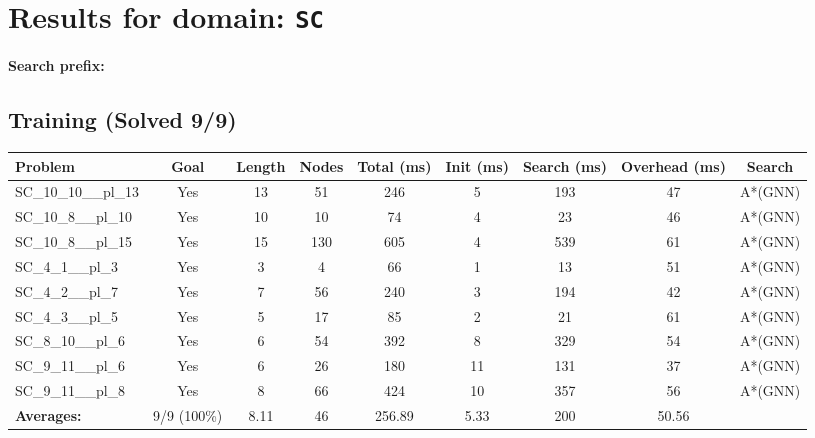 \documentclass{article}
\begin{document}
\section*{Results for domain: \texttt{SC}}
\textbf{Search prefix:} 
\\[0.5cm]
\subsection*{Training (Solved 9/9)}
\begin{tabular}{lcccccccc}
\toprule
Problem & Goal & Length & Nodes & Total (ms) & Init (ms) & Search (ms) & Overhead (ms) & Search \\
\midrule
SC\_10\_10\_\_pl\_13 & Yes & 13 & 51 & 246 & 5 & 193 & 47 & A*(GNN) \\
SC\_10\_8\_\_pl\_10 & Yes & 10 & 10 & 74 & 4 & 23 & 46 & A*(GNN) \\
SC\_10\_8\_\_pl\_15 & Yes & 15 & 130 & 605 & 4 & 539 & 61 & A*(GNN) \\
SC\_4\_1\_\_pl\_3 & Yes & 3 & 4 & 66 & 1 & 13 & 51 & A*(GNN) \\
SC\_4\_2\_\_pl\_7 & Yes & 7 & 56 & 240 & 3 & 194 & 42 & A*(GNN) \\
SC\_4\_3\_\_pl\_5 & Yes & 5 & 17 & 85 & 2 & 21 & 61 & A*(GNN) \\
SC\_8\_10\_\_pl\_6 & Yes & 6 & 54 & 392 & 8 & 329 & 54 & A*(GNN) \\
SC\_9\_11\_\_pl\_6 & Yes & 6 & 26 & 180 & 11 & 131 & 37 & A*(GNN) \\
SC\_9\_11\_\_pl\_8 & Yes & 8 & 66 & 424 & 10 & 357 & 56 & A*(GNN) \\
\textbf{Averages:} & 9/9 (100\%) & 8.11 & 46 & 256.89 & 5.33 & 200 & 50.56 & \\
\bottomrule
\end{tabular}
\\[0.7cm]
\end{document}
